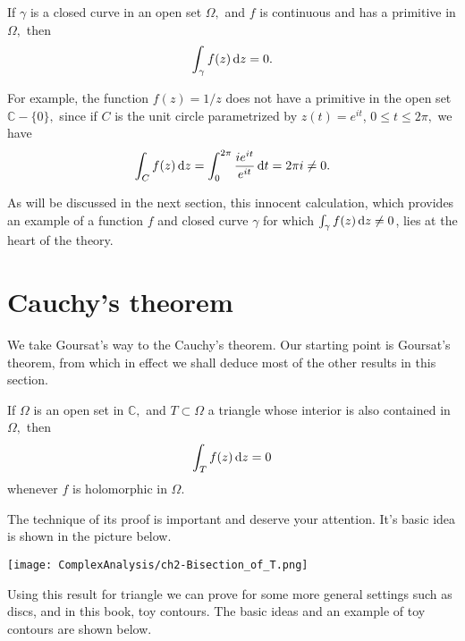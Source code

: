 \documentclass{chapter}
\begin{document}
            \begin{corollary}
                If $\gamma$ is a closed curve in an open set $\Omega,$ and $f$ is continuous and has a primitive in $\Omega,$ then \[\int_{\gamma} f(z) \mathop{}\!\mathrm{d} z=0.\]
            \end{corollary}

            \begin{example}
                For example, the function $f(z)=1 / z$ does not have a primitive in the open set $\mathbb{C}-\{0\},$ since if $C$ is the unit circle parametrized by $z(t)=e^{i t}$, $0 \leq t \leq 2 \pi,$ we have \[\int_{C} f(z) \mathop{}\!\mathrm{d} z=\int_{0}^{2 \pi} \frac{i e^{i t}}{e^{i t}} \mathop{}\!\mathrm{d} t=2 \pi i \neq 0.\]
            \end{example}

            As will be discussed in the next section, this innocent calculation, which provides an example of a function $f$ and closed curve $\gamma$ for which $\int_{\gamma} f(z) \mathop{}\!\mathrm{d} z \neq 0$, lies at the heart of the theory.

        \section{Cauchy’s theorem}
            We take Goursat's way to the Cauchy's theorem. Our starting point is Goursat’s theorem, from which in effect we shall deduce most of the other results in this section.

            \begin{theorem}
                If $\Omega$ is an open set in $\mathbb{C},$ and $T \subset \Omega$ a triangle whose interior is also contained in $\Omega,$ then \[\int_{T} f(z) \mathop{}\!\mathrm{d} z=0\] whenever $f$ is holomorphic in $\Omega$.
            \end{theorem}

            \begin{remark}
                The technique of its proof is important and deserve your attention. It's basic idea is shown in the picture below.

                \begin{center}
                    \texttt{[image: ComplexAnalysis/ch2-Bisection\_of\_T.png]}
                \end{center}
            \end{remark}
            
            Using this result for triangle we can prove for some more general settings such as discs, and in this book, toy contours. The basic ideas and an example of toy contours are shown below.
\end{document}
